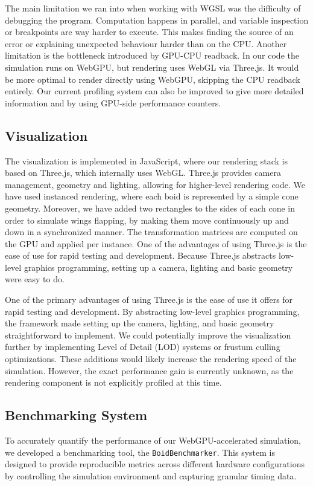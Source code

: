 \documentclass[a4paper, 12pt]{article}
\begin{document}
The main limitation we ran into when working with WGSL was the difficulty of debugging the program. Computation
happens in parallel, and variable inspection or breakpoints are way harder to
execute. This makes finding the source of an error or explaining unexpected
behaviour harder than on the CPU. Another limitation is the bottleneck
introduced by GPU-CPU readback. In our code the simulation runs on WebGPU, but
rendering uses WebGL via Three.js. It would be more optimal to render directly
using WebGPU, skipping the CPU readback entirely. Our current profiling system
can also be improved to give more detailed information and by using GPU-side
performance counters.

\subsection{Visualization}\label{subsec:visualisation}
The visualization is implemented in JavaScript, where our rendering stack is
based on Three.js, which internally uses WebGL. Three.js provides camera
management, geometry and lighting, allowing for higher-level rendering code. We
have used instanced rendering, where each boid is represented by a simple cone
geometry. Moreover, we have added two rectangles to the sides of each cone in order to simulate wings flapping, by making them move continuously up and down in a synchronized manner. The transformation matrices are computed on the GPU and applied per
instance. One of the advantages of using Three.js is the ease of use for rapid
testing and development. Because Three.js abstracts low-level graphics programming, setting up a camera, lighting and basic geometry were easy to do.

One of the primary advantages of using Three.js is the ease of use it offers for rapid testing and development. By abstracting low-level graphics programming, the framework made setting up the camera, lighting, and basic geometry straightforward to implement.  We could potentially improve the visualization further by implementing Level of Detail (LOD) systems or frustum culling optimizations. These additions would likely increase the rendering speed of the simulation. However, the exact performance gain is currently unknown, as the rendering component is not explicitly profiled at this time.

\subsection{Benchmarking System}
\label{subsec:benchmark}
To accurately quantify the performance of our WebGPU-accelerated simulation, we
developed a benchmarking tool, the \texttt{BoidBenchmarker}. This system is
designed to provide reproducible metrics across different hardware
configurations by controlling the simulation environment and capturing granular
timing data.
\end{document}
